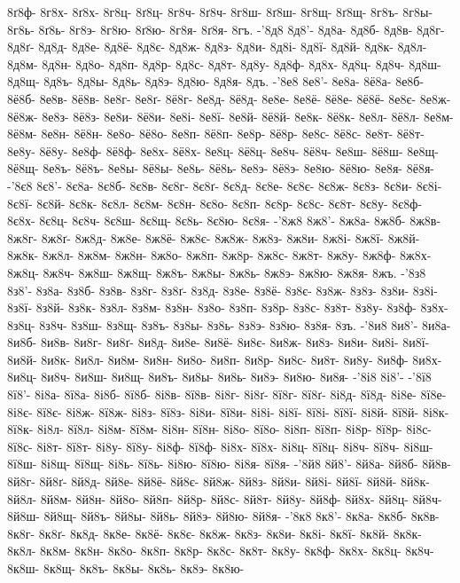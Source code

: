8ґ8ф-
8г8х-
8ґ8х-
8г8ц-
8ґ8ц-
8г8ч-
8ґ8ч-
8г8ш-
8ґ8ш-
8г8щ-
8ґ8щ-
8г8ъ-
8г8ы-
8г8ь-
8ґ8ь-
8г8э-
8г8ю-
8ґ8ю-
8г8я-
8ґ8я-
8гъ.
-'8д8
8д8'-
8д8а-
8д8б-
8д8в-
8д8г-
8д8ґ-
8д8д-
8д8е-
8д8ё-
8д8є-
8д8ж-
8д8з-
8д8и-
8д8і-
8д8ї-
8д8й-
8д8к-
8д8л-
8д8м-
8д8н-
8д8о-
8д8п-
8д8р-
8д8с-
8д8т-
8д8у-
8д8ф-
8д8х-
8д8ц-
8д8ч-
8д8ш-
8д8щ-
8д8ъ-
8д8ы-
8д8ь-
8д8э-
8д8ю-
8д8я-
8дъ.
-'8е8
8е8'-
8е8а-
8ё8а-
8е8б-
8ё8б-
8е8в-
8ё8в-
8е8г-
8е8ґ-
8ё8г-
8е8д-
8ё8д-
8е8е-
8е8ё-
8ё8е-
8ё8ё-
8е8є-
8е8ж-
8ё8ж-
8е8з-
8ё8з-
8е8и-
8ё8и-
8е8і-
8е8ї-
8е8й-
8ё8й-
8е8к-
8ё8к-
8е8л-
8ё8л-
8е8м-
8ё8м-
8е8н-
8ё8н-
8е8о-
8ё8о-
8е8п-
8ё8п-
8е8р-
8ё8р-
8е8с-
8ё8с-
8е8т-
8ё8т-
8е8у-
8ё8у-
8е8ф-
8ё8ф-
8е8х-
8ё8х-
8е8ц-
8ё8ц-
8е8ч-
8ё8ч-
8е8ш-
8ё8ш-
8е8щ-
8ё8щ-
8е8ъ-
8ё8ъ-
8е8ы-
8ё8ы-
8е8ь-
8ё8ь-
8е8э-
8ё8э-
8е8ю-
8ё8ю-
8е8я-
8ё8я-
-'8є8
8є8'-
8є8а-
8є8б-
8є8в-
8є8г-
8є8ґ-
8є8д-
8є8е-
8є8є-
8є8ж-
8є8з-
8є8и-
8є8і-
8є8ї-
8є8й-
8є8к-
8є8л-
8є8м-
8є8н-
8є8о-
8є8п-
8є8р-
8є8с-
8є8т-
8є8у-
8є8ф-
8є8х-
8є8ц-
8є8ч-
8є8ш-
8є8щ-
8є8ь-
8є8ю-
8є8я-
-'8ж8
8ж8'-
8ж8а-
8ж8б-
8ж8в-
8ж8г-
8ж8ґ-
8ж8д-
8ж8е-
8ж8ё-
8ж8є-
8ж8ж-
8ж8з-
8ж8и-
8ж8і-
8ж8ї-
8ж8й-
8ж8к-
8ж8л-
8ж8м-
8ж8н-
8ж8о-
8ж8п-
8ж8р-
8ж8с-
8ж8т-
8ж8у-
8ж8ф-
8ж8х-
8ж8ц-
8ж8ч-
8ж8ш-
8ж8щ-
8ж8ъ-
8ж8ы-
8ж8ь-
8ж8э-
8ж8ю-
8ж8я-
8жъ.
-'8з8
8з8'-
8з8а-
8з8б-
8з8в-
8з8г-
8з8ґ-
8з8д-
8з8е-
8з8ё-
8з8є-
8з8ж-
8з8з-
8з8и-
8з8і-
8з8ї-
8з8й-
8з8к-
8з8л-
8з8м-
8з8н-
8з8о-
8з8п-
8з8р-
8з8с-
8з8т-
8з8у-
8з8ф-
8з8х-
8з8ц-
8з8ч-
8з8ш-
8з8щ-
8з8ъ-
8з8ы-
8з8ь-
8з8э-
8з8ю-
8з8я-
8зъ.
-'8и8
8и8'-
8и8а-
8и8б-
8и8в-
8и8г-
8и8ґ-
8и8д-
8и8е-
8и8ё-
8и8є-
8и8ж-
8и8з-
8и8и-
8и8і-
8и8ї-
8и8й-
8и8к-
8и8л-
8и8м-
8и8н-
8и8о-
8и8п-
8и8р-
8и8с-
8и8т-
8и8у-
8и8ф-
8и8х-
8и8ц-
8и8ч-
8и8ш-
8и8щ-
8и8ъ-
8и8ы-
8и8ь-
8и8э-
8и8ю-
8и8я-
-'8і8
8і8'-
-'8ї8
8ї8'-
8і8а-
8ї8а-
8і8б-
8ї8б-
8і8в-
8ї8в-
8і8г-
8і8ґ-
8ї8г-
8ї8ґ-
8і8д-
8ї8д-
8і8е-
8ї8е-
8і8є-
8ї8є-
8і8ж-
8ї8ж-
8і8з-
8ї8з-
8і8и-
8ї8и-
8і8і-
8і8ї-
8ї8і-
8ї8ї-
8і8й-
8ї8й-
8і8к-
8ї8к-
8і8л-
8ї8л-
8і8м-
8ї8м-
8і8н-
8ї8н-
8і8о-
8ї8о-
8і8п-
8ї8п-
8і8р-
8ї8р-
8і8с-
8ї8с-
8і8т-
8ї8т-
8і8у-
8ї8у-
8і8ф-
8ї8ф-
8і8х-
8ї8х-
8і8ц-
8ї8ц-
8і8ч-
8ї8ч-
8і8ш-
8ї8ш-
8і8щ-
8ї8щ-
8і8ь-
8ї8ь-
8і8ю-
8ї8ю-
8і8я-
8ї8я-
-'8й8
8й8'-
8й8а-
8й8б-
8й8в-
8й8г-
8й8ґ-
8й8д-
8й8е-
8й8ё-
8й8є-
8й8ж-
8й8з-
8й8и-
8й8і-
8й8ї-
8й8й-
8й8к-
8й8л-
8й8м-
8й8н-
8й8о-
8й8п-
8й8р-
8й8с-
8й8т-
8й8у-
8й8ф-
8й8х-
8й8ц-
8й8ч-
8й8ш-
8й8щ-
8й8ъ-
8й8ы-
8й8ь-
8й8э-
8й8ю-
8й8я-
-'8к8
8к8'-
8к8а-
8к8б-
8к8в-
8к8г-
8к8ґ-
8к8д-
8к8е-
8к8ё-
8к8є-
8к8ж-
8к8з-
8к8и-
8к8і-
8к8ї-
8к8й-
8к8к-
8к8л-
8к8м-
8к8н-
8к8о-
8к8п-
8к8р-
8к8с-
8к8т-
8к8у-
8к8ф-
8к8х-
8к8ц-
8к8ч-
8к8ш-
8к8щ-
8к8ъ-
8к8ы-
8к8ь-
8к8э-
8к8ю-
